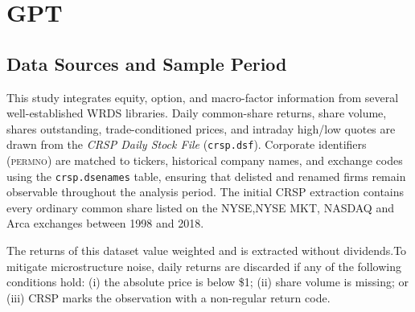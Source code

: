 





\section{GPT}
\subsection{Data Sources and Sample Period}\label{sec:data_sources}

This study integrates equity, option, and macro-factor information from several well-established WRDS libraries. Daily common-share returns, share volume, shares outstanding, trade-conditioned prices, and intraday high/low quotes are drawn from the \emph{CRSP Daily Stock File} (\texttt{crsp.dsf}). Corporate identifiers (\textsc{permno}) are matched to tickers, historical company names, and exchange codes using the \texttt{crsp.dsenames} table, ensuring that delisted and renamed firms remain observable throughout the analysis period. The initial CRSP extraction contains every ordinary common share listed on the NYSE,NYSE MKT, NASDAQ and Arca exchanges between 1998 and 2018. 

The returns of this dataset value weighted and is extracted without dividends.To mitigate microstructure noise, daily returns are discarded if any of the following conditions hold: (i) the absolute price is below \$1; (ii) share volume is missing; or (iii) CRSP marks the observation with a non-regular return code.

